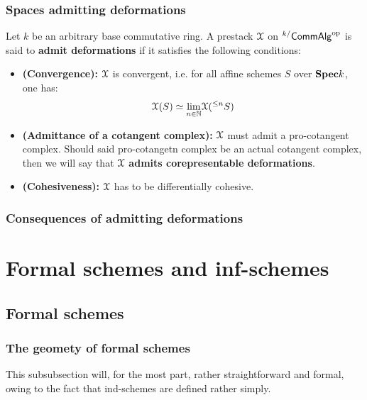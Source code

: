         
            \subsubsection{Spaces admitting deformations}
                \begin{definition} \label{def: prestacks_admitting_deformations}
                    Let $k$ be an arbitrary base commutative ring. A prestack $\mathcal{X}$ on ${}^{k/}\mathsf{Comm}\mathsf{Alg}^{\mathrm{op}}$ is said to \textbf{admit deformations} if it satisfies the following conditions:
                        \begin{itemize}
                            \item \textbf{(Convergence):} $\mathcal{X}$ is convergent, i.e. for all affine schemes $S$ over $\mathbf{Spec} k$, one has:
                                $$\mathcal{X}(S) \simeq \underset{n \in \mathbb{N}}{\operatorname{lim}} \mathcal{X}({}^{\leq n}S)$$
                            \item \textbf{(Admittance of a cotangent complex):} $\mathcal{X}$ must admit a pro-cotangent complex. Should said pro-cotangetn complex be an actual cotangent complex, then we will say that $\mathcal{X}$ \textbf{admits corepresentable deformations}.
                            \item \textbf{(Cohesiveness):} $\mathcal{X}$ has to be differentially cohesive.
                        \end{itemize}
                \end{definition}
            
            \subsubsection{Consequences of admitting deformations}
            
    \section{Formal schemes and inf-schemes} \label{section: formal_schemes_and_inf_schemes}
        \subsection{Formal schemes}
            \subsubsection{The geomety of formal schemes}
                This subsubsection will, for the most part, rather straightforward and formal, owing to the fact that ind-schemes are defined rather simply.
                

